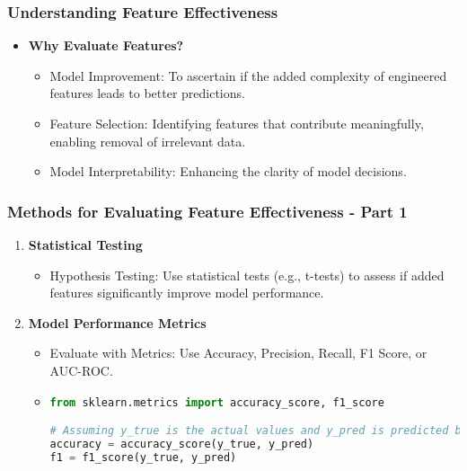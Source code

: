 \documentclass[aspectratio=169]{beamer}
\begin{document}
\begin{frame}[fragile]
    \frametitle{Understanding Feature Effectiveness}
    
    \begin{itemize}
        \item \textbf{Why Evaluate Features?}
        \begin{itemize}
            \item Model Improvement: To ascertain if the added complexity of engineered features leads to better predictions.
            \item Feature Selection: Identifying features that contribute meaningfully, enabling removal of irrelevant data.
            \item Model Interpretability: Enhancing the clarity of model decisions.
        \end{itemize}
    \end{itemize}
\end{frame}

\begin{frame}[fragile]
    \frametitle{Methods for Evaluating Feature Effectiveness - Part 1}
    
    \begin{enumerate}
        \item \textbf{Statistical Testing}
        \begin{itemize}
            \item Hypothesis Testing: Use statistical tests (e.g., t-tests) to assess if added features significantly improve model performance.
        \end{itemize}
        
        \item \textbf{Model Performance Metrics}
        \begin{itemize}
            \item Evaluate with Metrics: Use Accuracy, Precision, Recall, F1 Score, or AUC-ROC.
            \item \begin{lstlisting}[language=Python]
from sklearn.metrics import accuracy_score, f1_score

# Assuming y_true is the actual values and y_pred is predicted by model
accuracy = accuracy_score(y_true, y_pred)
f1 = f1_score(y_true, y_pred)
            \end{lstlisting}
        \end{itemize}
    \end{enumerate}
\end{frame}
\end{document}
